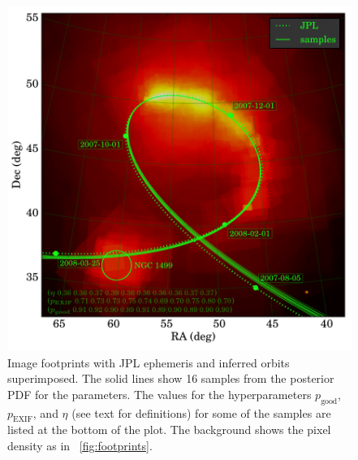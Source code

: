 \documentclass[12pt,preprint]{aastex}
\newcommand{\figref}[1]{\figurename~\ref{#1}}
\newcommand{\pgood}{p_\mathrm{good}}
\newcommand{\exif}{\mathrm{EXIF}}
\newcommand{\pexif}{p_\exif}
\begin{document}
\clearpage
\begin{figure}
\begin{center}
\includegraphics[width=\textwidth]{traj-default-nw064-bw008-emp-3000.pdf}
\end{center}
\caption[results]{Image footprints with JPL ephemeris and inferred
  orbits superimposed.  The solid lines show 16 samples from the
  posterior PDF for the parameters.  The values for the
  hyperparameters $\pgood$, $\pexif$, and $\eta$ (see text for
  definitions) for some of the samples are listed at the bottom of
  the plot.  The background shows the pixel density as in
  \figref{fig:footprints}.\label{fig:traj}}
\end{figure}
\end{document}
